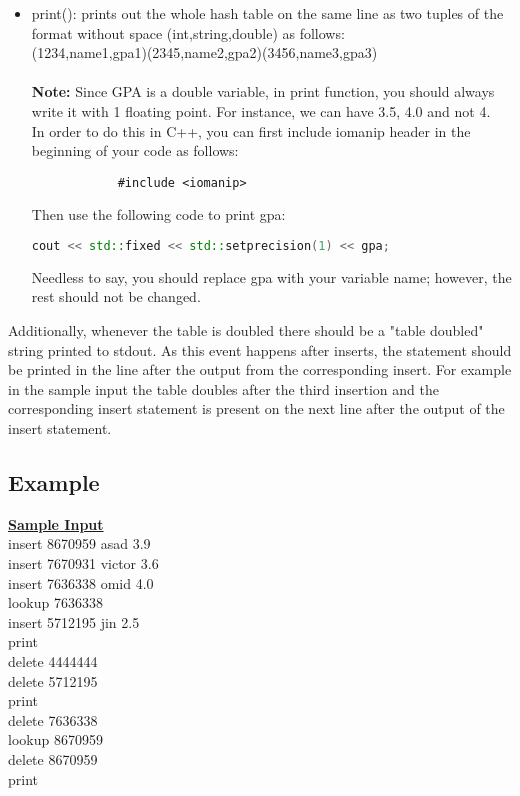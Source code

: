 \documentclass[times, 12pt]{article}
\begin{document}
\begin{itemize}
\begin{itemize}
        \item print(): prints out the whole hash table on the same line as two tuples of the format without space (int,string,double) as follows:\\
        (1234,name1,gpa1)(2345,name2,gpa2)(3456,name3,gpa3)\\\\
        \textbf{Note:} Since GPA is a double variable, in print function, you should always write it with 1 floating point. For instance, we can have 3.5, 4.0 and not 4.\\
        In order to do this in C++, you can first include iomanip header in the beginning of your code as follows:
        \begin{lstlisting}
            #include <iomanip>
        \end{lstlisting}
        
        Then use the following code to print gpa:
        
        \begin{lstlisting}[language=C++,
            directivestyle={\color{black}}
            emph={int,char,double,float,unsigned},
            emphstyle={\color{green}}
            ]
            cout << std::fixed << std::setprecision(1) << gpa;
        \end{lstlisting}
            
        Needless to say, you should replace gpa with your variable name; however, the rest should not be changed.
    \end{itemize}
\end{itemize}

Additionally, whenever the table is doubled there should be a "table doubled" string printed to stdout. As
this event happens after inserts, the statement should be printed in the line after the output from
the corresponding insert. For example in the sample input the table doubles after the third
insertion and the corresponding insert statement is present on the next line after the output of the insert statement.

\subsection*{Example}
\underline{\textbf{Sample Input}}\\
insert 8670959 asad 3.9\\
insert 7670931 victor 3.6\\
insert 7636338 omid 4.0\\
lookup 7636338\\
insert 5712195 jin 2.5\\
print\\
delete 4444444\\
delete 5712195\\
print\\
delete 7636338\\
lookup 8670959\\
delete 8670959\\
print\\
\end{document}
